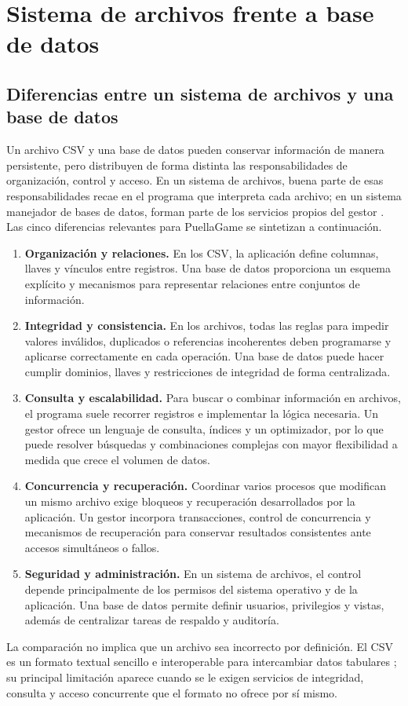 \section{Sistema de archivos frente a base de datos}
\subsection{Diferencias entre un sistema de archivos y una base de datos}

Un archivo CSV y una base de datos pueden conservar información de manera
persistente, pero distribuyen de forma distinta las responsabilidades de
organización, control y acceso. En un sistema de archivos, buena parte de esas
responsabilidades recae en el programa que interpreta cada archivo; en un
sistema manejador de bases de datos, forman parte de los servicios propios del
gestor \cite{elmasri2016,silberschatz2019}. Las cinco diferencias relevantes
para PuellaGame se sintetizan a continuación.

\begin{enumerate}[leftmargin=*]
    \item \textbf{Organización y relaciones.} En los CSV, la aplicación define
    columnas, llaves y vínculos entre registros. Una base de datos proporciona
    un esquema explícito y mecanismos para representar relaciones entre
    conjuntos de información.
    \item \textbf{Integridad y consistencia.} En los archivos, todas las reglas
    para impedir valores inválidos, duplicados o referencias incoherentes deben
    programarse y aplicarse correctamente en cada operación. Una base de datos
    puede hacer cumplir dominios, llaves y restricciones de integridad de forma
    centralizada.
    \item \textbf{Consulta y escalabilidad.} Para buscar o combinar información
    en archivos, el programa suele recorrer registros e implementar la lógica
    necesaria. Un gestor ofrece un lenguaje de consulta, índices y un
    optimizador, por lo que puede resolver búsquedas y combinaciones complejas
    con mayor flexibilidad a medida que crece el volumen de datos.
    \item \textbf{Concurrencia y recuperación.} Coordinar varios procesos que
    modifican un mismo archivo exige bloqueos y recuperación desarrollados por
    la aplicación. Un gestor incorpora transacciones, control de concurrencia y
    mecanismos de recuperación para conservar resultados consistentes ante
    accesos simultáneos o fallos.
    \item \textbf{Seguridad y administración.} En un sistema de archivos, el
    control depende principalmente de los permisos del sistema operativo y de
    la aplicación. Una base de datos permite definir usuarios, privilegios y
    vistas, además de centralizar tareas de respaldo y auditoría.
\end{enumerate}

La comparación no implica que un archivo sea incorrecto por definición. El CSV
es un formato textual sencillo e interoperable para intercambiar datos
tabulares \cite{shafranovich2005}; su principal limitación aparece cuando se le
exigen servicios de integridad, consulta y acceso concurrente que el formato no
ofrece por sí mismo.
